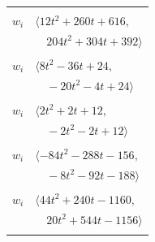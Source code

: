\documentclass[11pt]{article}
\begin{document}
\begin{longtable}{@{}ll@{}}
\addlinespace[2pt]
\multicolumn{2}{@{}p{0.97\textwidth}@{}}{$i=5$, $D_i=4$, $\rho_{ij}$: $1{:}1, \allowbreak 12{:}1, \allowbreak 14{:}2, \allowbreak 20{:}1, \allowbreak 31{:}1, \allowbreak 36{:}1, \allowbreak 42{:}1, \allowbreak 47{:}2, \allowbreak 50{:}2, \allowbreak 52{:}2, \allowbreak 58{:}2, \allowbreak 68{:}2$}\\
$w_i$ & $\langle 12t^{2}+260t+616,$\\
 & $\quad 204t^{2}+304t+392\rangle$\\
\addlinespace[2pt]
\multicolumn{2}{@{}p{0.97\textwidth}@{}}{$i=6$, $D_i=4$, $\rho_{ij}$: $2{:}1, \allowbreak 17{:}2, \allowbreak 19{:}1, \allowbreak 22{:}2, \allowbreak 37{:}1, \allowbreak 46{:}1, \allowbreak 48{:}1, \allowbreak 52{:}2, \allowbreak 66{:}2, \allowbreak 67{:}2, \allowbreak 68{:}1$}\\
$w_i$ & $\langle 8t^{2}-36t+24,$\\
 & $\quad -20t^{2}-4t+24\rangle$\\
\addlinespace[2pt]
\multicolumn{2}{@{}p{0.97\textwidth}@{}}{$i=7$, $D_i=2$, $\rho_{ij}$: $15{:}1, \allowbreak 20{:}2, \allowbreak 35{:}1, \allowbreak 54{:}2, \allowbreak 58{:}2$}\\
$w_i$ & $\langle 2t^{2}+2t+12,$\\
 & $\quad -2t^{2}-2t+12\rangle$\\
\addlinespace[2pt]
\multicolumn{2}{@{}p{0.97\textwidth}@{}}{$i=8$, $D_i=4$, $\rho_{ij}$: $2{:}1, \allowbreak 14{:}2, \allowbreak 15{:}2, \allowbreak 17{:}1, \allowbreak 25{:}2, \allowbreak 27{:}1, \allowbreak 29{:}1, \allowbreak 30{:}2, \allowbreak 34{:}1, \allowbreak 37{:}1, \allowbreak 45{:}1, \allowbreak 47{:}2, \allowbreak 52{:}2, \allowbreak 53{:}1, \allowbreak 56{:}1, \allowbreak 63{:}2$}\\
$w_i$ & $\langle -84t^{2}-288t-156,$\\
 & $\quad -8t^{2}-92t-188\rangle$\\
\addlinespace[2pt]
\multicolumn{2}{@{}p{0.97\textwidth}@{}}{$i=9$, $D_i=4$, $\rho_{ij}$: $15{:}1, \allowbreak 24{:}2, \allowbreak 29{:}1, \allowbreak 31{:}2, \allowbreak 44{:}2, \allowbreak 48{:}2, \allowbreak 50{:}1, \allowbreak 54{:}2, \allowbreak 59{:}1$}\\
$w_i$ & $\langle 44t^{2}+240t-1160,$\\
 & $\quad 20t^{2}+544t-1156\rangle$\\
\addlinespace[2pt]
\multicolumn{2}{@{}p{0.97\textwidth}@{}}{$i=10$, $D_i=8$, $\rho_{ij}$: $0{:}1, \allowbreak 12{:}1, \allowbreak 13{:}1, \allowbreak 18{:}2, \allowbreak 22{:}2, \allowbreak 23{:}2, \allowbreak 24{:}2, \allowbreak 31{:}1, \allowbreak 32{:}1, \allowbreak 49{:}2, \allowbreak 50{:}1, \allowbreak 54{:}2$}\\

\end{longtable}
\end{document}
